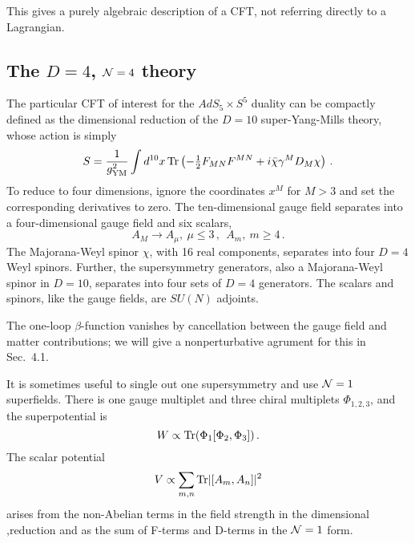 \documentclass[12pt]{article}
\begin{document}
{This gives a purely algebraic description of a CFT, not referring directly to a Lagrangian.

\subsection{The $D=4$, ${\cal N} = 4$ theory}

The particular CFT of interest for the $AdS_5 \times S^5$ duality can be compactly defined as the dimensional reduction of the $D=10$ super-Yang-Mills theory, whose action is simply
\begin{equation}
S = \frac{1}{g_{\rm YM}^2} \int d^{10} x\, {\rm Tr}\left(- {\textstyle\frac{1}{2}} F_{MN}F^{MN} + i \bar\chi \gamma^M D_M \chi \right) \,. \label{n4act}
\end{equation}
To reduce to four dimensions, ignore the coordinates $x^M$ for  $M > 3$ and set the corresponding derivatives to zero.  The ten-dimensional gauge field separates into a four-dimensional gauge field and six scalars, 
\begin{equation}
A_M \to A_{\mu},\ \mu \leq 3\,,\ \ A_m,\ m \geq 4\,.
\end{equation}
The Majorana-Weyl spinor $\chi$, with 16 real components, separates into four $D=4$ Weyl spinors.  Further, the supersymmetry generators, also a Majorana-Weyl spinor in $D=10$, separates into four sets of $D=4$ generators. The scalars and spinors, like the gauge fields, are $SU(N)$ adjoints.  

The one-loop $\beta$-function vanishes by cancellation between the gauge field and matter contributions; we will give a nonperturbative agrument for this in Sec.~4.1.

It is sometimes useful to single out one supersymmetry and use ${\cal N}=1$ superfields.  There is one gauge multiplet and three chiral multiplets $\Phi_{1,2,3}$, and the superpotential is
\begin{equation}
W \propto {\rm Tr}(\Phi_1 [\Phi_2,\Phi_3]) \,.
\end{equation}
The scalar potential
\begin{equation}
V \propto \sum_{m,n}  {\rm Tr}|[A_m,A_n]|^2
\end{equation}
arises from the non-Abelian terms in the field strength in the dimensional ,reduction and as the sum of F-terms and D-terms in the ${\cal N}=1$ form.

}
\end{document}
